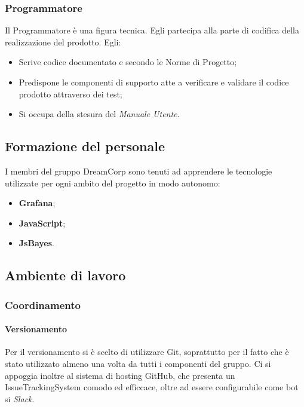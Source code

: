                 \subsubsection{Programmatore}
                    Il Programmatore è una figura tecnica. Egli partecipa alla parte di codifica della realizzazione del prodotto. Egli:
                    \begin{itemize}
                        \item Scrive codice documentato e secondo le Norme di Progetto;
                        \item Predispone le componenti di supporto atte a verificare e validare il codice prodotto attraverso dei test;
                        \item Si occupa della stesura del \textit{Manuale Utente}.
                    \end{itemize}
                \subsection{Formazione del personale}
                    I membri del gruppo DreamCorp sono tenuti ad apprendere le tecnologie utilizzate per ogni ambito del progetto in modo autonomo:
                    \begin{itemize}
                        \item \textbf{Grafana};
                        \item \textbf{JavaScript};
                        \item \textbf{JsBayes}.
                    \end{itemize}
                \subsection{Ambiente di lavoro}
                    \subsubsection{Coordinamento}
                        \paragraph{Versionamento} 
                            Per il versionamento si è scelto di utilizzare Git, soprattutto per il fatto che è stato utilizzato almeno una volta da tutti i componenti del gruppo. Ci si appoggia inoltre al sistema di hosting GitHub, che presenta un IssueTrackingSystem comodo ed efficcace, oltre ad essere configurabile come bot si \textit{Slack}.
